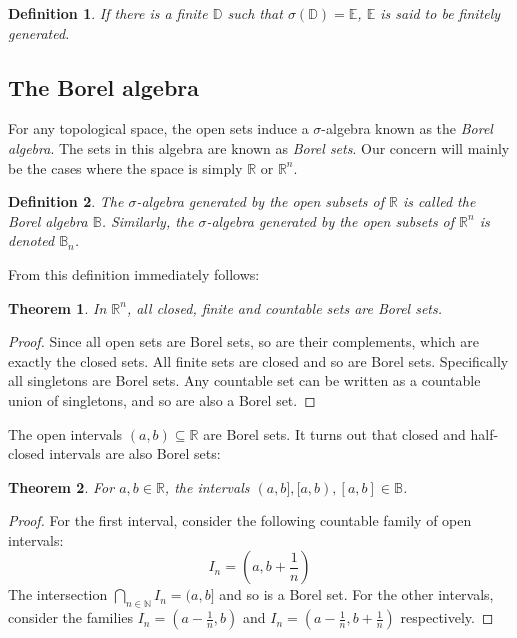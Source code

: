 \documentclass[12pt, a4paper]{article}
\newtheorem{theorem}{Theorem}[section]
\newtheorem{definition}{Definition}[section]
\numberwithin{equation}{section}
\begin{document}
\begin{definition}
If there is a finite $\mathbb{D}$ such that $\sigma(\mathbb{D})=\mathbb{E}$, $\mathbb{E}$ is said to be finitely generated.  
\end{definition}

\subsection{The Borel algebra}
For any topological space, the open sets induce a $\sigma$-algebra known as the \textit{Borel algebra}. The sets in this algebra are known as \textit{Borel sets}. Our concern will mainly be the cases where the space is simply $\mathbb{R}$ or $\mathbb{R}^n$.

\begin{definition}
The $\sigma$-algebra generated by the open subsets of $\mathbb{R}$ is called the Borel algebra $\mathbb{B}$. Similarly, the $\sigma$-algebra generated by the open subsets of $\mathbb{R}^n$ is denoted $\mathbb{B}_n$.
\end{definition}

From this definition immediately follows:

\begin{theorem}
In $\mathbb{R}^n$, all closed, finite and countable sets are Borel sets.
\end{theorem}
\begin{proof}
Since all open sets are Borel sets, so are their complements, which are exactly the closed sets. All finite sets are closed and so are Borel sets. Specifically all singletons are Borel sets. Any countable set can be written as a countable union of singletons, and so are also a Borel set.
\end{proof}

The open intervals $(a,b)\subseteq\mathbb{R}$ are Borel sets. It turns out that closed and half-closed intervals are also Borel sets:

\begin{theorem}
For $a,b\in\mathbb{R}$, the intervals $(a,b], [a,b), [a,b]\in\mathbb{B}$.
\end{theorem}
\begin{proof}
For the first interval, consider the following countable family of open intervals:
\begin{equation}
I_n=\left(a,b+\frac{1}{n}\right)
\end{equation}
The intersection $\bigcap_{n\in\mathbb{N}}I_n=(a,b]$ and so is a Borel set. For the other intervals, consider the families $I_n=\left(a-\frac{1}{n},b\right)$ and $I_n=\left(a-\frac{1}{n},b+\frac{1}{n}\right)$ respectively.
\end{proof}
\end{document}
